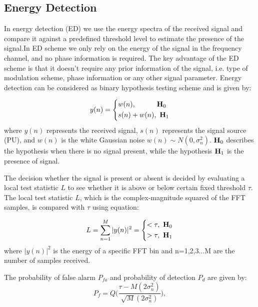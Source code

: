 \subsection{Energy Detection}
In energy detection (ED) we use the energy spectra of the received signal and compare it against a predefined threshold level to estimate the presence of the signal.In ED scheme we only rely on the energy of the signal in the frequency channel, and no phase information is required. The key advantage of the ED scheme is that it doesn't require any prior information of the signal, i.e. type of modulation scheme, phase information or any other signal parameter. Energy detection can be considered as binary hypothesis testing scheme and is given by:

\begin{equation}
	\label{eq:1}
     y(n) = 
     \left\{
     \begin{aligned}
   &w(n),~~~~~~~~~\mathbf{H}_0\\
   &s(n) + w(n),~\mathbf{H}_1
    \end{aligned}
    \right.
\end{equation}
where $y(n)$ represents the received signal, $s(n)$ represents the signal source (PU), and $w(n)$ is the white Gaussian noise $w(n) \sim N(0,\sigma_n^2) $. $\mathbf{H}_0$ describes the hypothesis when there is no signal present, while the hypothesis $\mathbf{H}_1$ is the presence of signal.

The decision whether the signal is present or absent is decided by evaluating a local test statistic $L$ to see whether it is above or below certain fixed threshold $\tau$. 
The local test statistic $L$, which is the complex-magnitude squared of the FFT samples, is compared with $\tau$ using equation:

\begin{equation}
\label{eq:2}
	L = \sum_{n=1}^{M}{|y(n)|^2} = 
	\left\{
	\begin{aligned}
		<\tau,~\mathbf{H}_0 \\
		>\tau,~\mathbf{H}_1		
	\end{aligned}
	\right.
\end{equation}
where $|y(n)|^2$ is the energy of a specific FFT bin and n=1,2,3...M are the number of samples received.

The probability of false alarm $P_{fa}$ and probability of detection $P_d$ are given by:
\begin{equation}
\label{eq:3}
P_f = Q\Bigg(\dfrac{\tau-M(2\sigma_n^2)}{\sqrt{M}(2\sigma_n^2)}\Bigg),
\end{equation}

